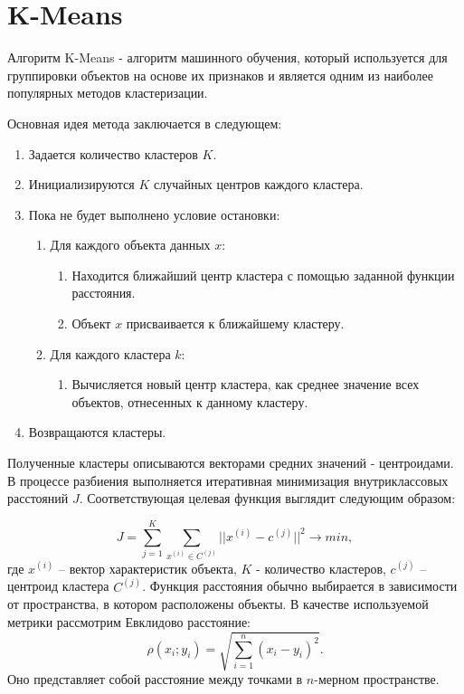 \documentclass{article}
\begin{document}
\section{K-Means}

Алгоритм K-Means - алгоритм машинного обучения, который используется для группировки объектов на основе их признаков и является одним из наиболее популярных методов кластеризации.

Основная идея метода заключается в следующем:
\begin{enumerate}
\item Задается количество кластеров $K$.
\item Инициализируются $K$ случайных центров каждого кластера.
\item Пока не будет выполнено условие остановки:
\begin{enumerate}
\item Для каждого объекта данных $x$:
\begin{enumerate}
\item Находится ближайший центр кластера с помощью заданной функции расстояния.
\item Объект $x$ присваивается к ближайшему кластеру.
\end{enumerate}
\item Для каждого кластера $k$:
\begin{enumerate}
\item Вычисляется новый центр кластера, как среднее значение всех объектов, отнесенных к данному кластеру.
\end{enumerate}
\end{enumerate}
\item Возвращаются кластеры.
\end{enumerate}

Полученные кластеры описываются векторами средних значений - центроидами. В процессе разбиения выполняется итеративная минимизация внутриклассовых расстояний $J$. Соответствующая целевая функция выглядит следующим образом:

\begin{equation}
J = \sum_{j=1}^{K}  \sum_{x^{(i)} \in C^{(j)}} ||x^{(i)}-c^{(j)}||^2 \to min,
\end{equation}
где $x^{(i)}$ – вектор характеристик объекта, $K$ - количество кластеров, $c^{(j)}$ – центроид кластера $C^{(j)}$.  
Функция расстояния обычно выбирается в зависимости от пространства, в котором расположены объекты. В качестве используемой метрики рассмотрим Евклидово расстояние:
\begin{equation}
\rho(x_{i};y_{i}) = \sqrt{\sum_{i=1}^{n} (x_{i}-y_{i})^2}.
\end{equation}
Оно представляет собой расстояние между точками в $n$-мерном пространстве. 
\end{document}
